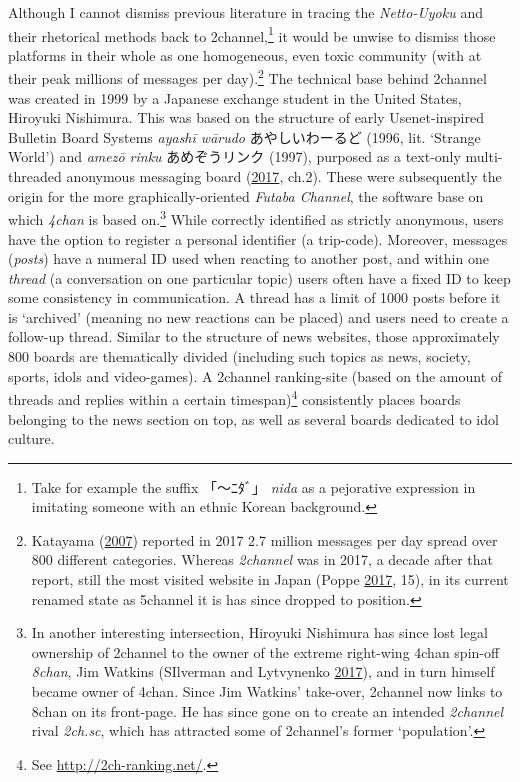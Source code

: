 \documentclass[10pt,british,A4paper,,openany]{memoir}
\begin{document}
Although I cannot dismiss previous literature in tracing the
\emph{Netto-Uyoku} and their rhetorical methods back to
2channel,\footnote{Take for example the suffix 「～ﾆﾀﾞ」 \emph{nida} as
  a pejorative expression in imitating someone with an ethnic Korean
  background.} it would be unwise to dismiss those platforms in their
whole as one homogeneous, even toxic community (with at their peak
millions of messages per day).\footnote{Katayama
  (\protect\hyperlink{ref-katayama_2-channel_2007}{2007}) reported in
  2017 2.7 million messages per day spread over 800 different
  categories. Whereas \emph{2channel} was in 2017, a decade after that
  report, still the  most visited website in Japan (Poppe
  \protect\hyperlink{ref-poppe_digitaal_2017}{2017}, 15), in its current
  renamed state as 5channel it is has since dropped to 
  position.} The technical base behind 2channel was created in 1999 by a
Japanese exchange student in the United States, Hiroyuki Nishimura. This
was based on the structure of early Usenet-inspired Bulletin Board
Systems \emph{ayashī wārudo} あやしいわーるど (1996, lit. `Strange
World') and \emph{amezō rinku} あめぞうリンク (1997), purposed as a
text-only multi-threaded anonymous messaging board
(\protect\hyperlink{ref-barubora_eng:_2017}{2017}, ch.2). These were
subsequently the origin for the more graphically-oriented \emph{Futaba
Channel}, the software base on which \emph{4chan} is based on.\footnote{In
  another interesting intersection, Hiroyuki Nishimura has since lost
  legal ownership of 2channel to the owner of the extreme right-wing
  4chan spin-off \emph{8chan}, Jim Watkins (SIlverman and Lytvynenko
  \protect\hyperlink{ref-silverman_meet_2017}{2017}), and in turn
  himself became owner of 4chan. Since Jim Watkins' take-over, 2channel
  now links to 8chan on its front-page. He has since gone on to create
  an intended \emph{2channel} rival \emph{2ch.sc}, which has attracted
  some of 2channel's former `population'.} While correctly identified as
strictly anonymous, users have the option to register a personal
identifier (a trip-code). Moreover, messages (\emph{posts}) have a
numeral ID used when reacting to another post, and within one
\emph{thread} (a conversation on one particular topic) users often have
a fixed ID to keep some consistency in communication. A thread has a
limit of 1000 posts before it is `archived' (meaning no new reactions
can be placed) and users need to create a follow-up thread. Similar to
the structure of news websites, those approximately 800 boards are
thematically divided (including such topics as news, society, sports,
idols and video-games). A 2channel ranking-site (based on the amount of
threads and replies within a certain timespan)\footnote{See
  \url{http://2ch-ranking.net/}.} consistently places boards belonging
to the news section on top, as well as several boards dedicated to idol
culture.
\end{document}
